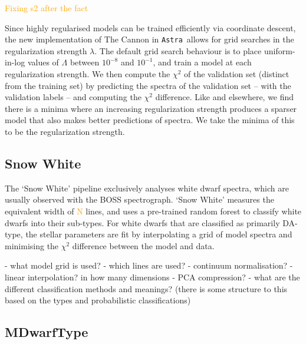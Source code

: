 \documentclass[modern]{aastex631}
\newcommand{\astra}{\texttt{Astra}}
\newcommand{\todo}[1]{\textcolor{orange}{#1}}
\begin{document}
\todo{Fixing s2 after the fact}

Since highly regularised models can be trained efficiently via coordinate descent, the new implementation of The Cannon in \astra\ allows for grid searches in the regularization strength $\lambda$. The default grid search behaviour is to place uniform-in-log values of $\Lambda$ between $10^{-8}$ and $10^{-1}$, and train a model at each regularization strength. We then compute the $\chi^2$ of the validation set (distinct from the training set) by predicting the spectra of the validation set -- with the validation labels -- and computing the $\chi^2$ difference. Like \citet{Casey} and elsewhere, we find there is a minima where an increasing regularization strength produces a sparser model that also makes better predictions of spectra. We take the minima of this to be the regularization strength. 





\subsection{Snow White} \label{sec:methods-snow-white}

The `Snow White' pipeline exclusively analyses white dwarf spectra, which are usually observed with the BOSS 
spectrograph. %
`Snow White' measures the equivalent width of \todo{N} lines, and uses a pre-trained random forest \citep{RF} to classify white dwarfs into their sub-types. For white dwarfs that are classified as primarily DA-type, the stellar parameters are fit by interpolating a grid of \citep{who} model spectra and minimising the $\chi^2$ difference between the model and data.

- what model grid is used?
- which lines are used?
- continuum normalisation?
- linear interpolation? in how many dimensions
- PCA compression?
- what are the different classification methods and meanings? (there is some structure to this based on the types and probabilistic classifications)

\subsection{MDwarfType} \label{sec:methods-m-dwarf-type}
\end{document}
